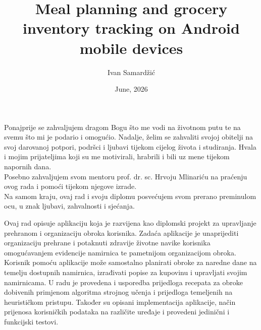 \documentclass[diplomskirad]{fer}
\title{Meal planning and grocery inventory tracking on Android mobile devices}
\author{Ivan Samardžić}
\date{June, 2026}
\begin{document}
\maketitle






\begin{zahvale}
  Ponajprije se zahvaljujem dragom Bogu što me vodi na životnom putu te na svemu što mi je podario i omogućio. Nadalje, želim se zahvaliti svojoj obitelji na svoj darovanoj potpori, podršci i ljubavi tijekom cijelog života i studiranja. Hvala i mojim prijateljima koji su me motivirali, hrabrili i bili uz mene tijekom napornih dana. 
  \\
  Posebno zahvaljujem svom mentoru prof. dr. sc. Hrvoju Mlinariću na praćenju ovog rada i pomoći tijekom njegove izrade.
  \\
  Na samom kraju, ovaj rad i svoju diplomu posvećujem svom prerano preminulom ocu, u znak ljubavi, zahvalnosti i sjećanja.
\end{zahvale}


\mainmatter



\begin{sazetak}
Ovaj rad opisuje aplikaciju koja je razvijena kao diplomski projekt za upravljanje prehranom i organizaciju obroka korisnika. Zadaća aplikacije je unaprijediti organizaciju prehrane i potaknuti zdravije životne navike korisnika omogućavanjem evidencije namirnica te pametnijom organizacijom obroka. Korisnik pomoću aplikacije može samostalno planirati obroke za naredne dane na temelju dostupnih namirnica, izrađivati popise za kupovinu i upravljati svojim namirnicama. U radu je provedena i usporedba prijedloga recepata za obroke dobivenih primjenom algoritma strojnog učenja i prijedloga temeljenih na heurističkom pristupu. Također su opisani implementacija aplikacije, način prijenosa korisničkih podataka na različite uređaje i provedeni jedinični i funkcijski testovi.

\end{sazetak}
\end{document}
